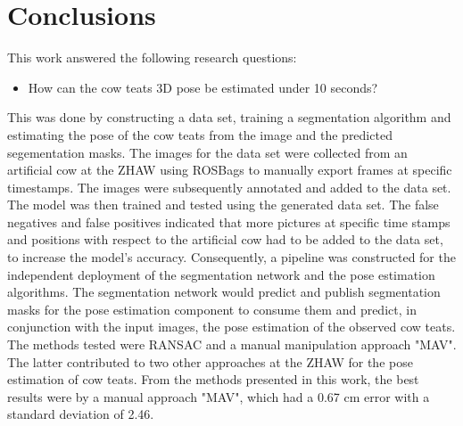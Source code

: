 \section{Conclusions}\label{sec:conclusions}
    This work answered the following research questions:
    \begin{itemize}
        \item How can the cow teats 3D pose be estimated under 10 seconds?
    \end{itemize}
   

    This was done by constructing a data set, training a segmentation algorithm and estimating the pose of the cow teats from the image and the predicted segementation masks. The images for the data set were collected from an artificial cow at the ZHAW using ROSBags to manually export frames at specific timestamps. The images were subsequently annotated and added to the data set. The model was then trained and tested using the generated data set. The false negatives and false positives indicated that more pictures at specific time stamps and positions with respect to the artificial cow had to be added to the data set, to increase the model's accuracy. Consequently, a pipeline was constructed for the independent deployment of the segmentation network and the pose estimation algorithms. The segmentation network would predict and publish segmentation masks for the pose estimation component to consume them and predict, in conjunction with the input images, the pose estimation of the observed cow teats. The methods tested were RANSAC and a manual manipulation approach "MAV". The latter contributed to two other approaches at the ZHAW for the pose estimation of cow teats. From the methods presented in this work, the best results were by a manual approach "MAV", which had a 0.67 cm error with a standard deviation of 2.46. 
    
